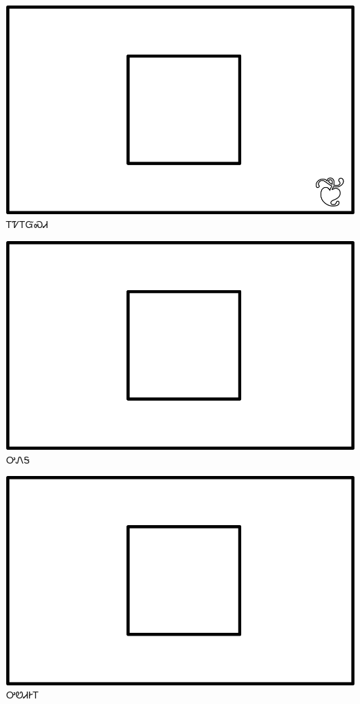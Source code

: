 \documentclass[avery5371]{flashcards}%
\begin{document}

\begin{flashcard}{
\includegraphics[width=0.95\columnwidth,height=.51\columnwidth,keepaspectratio]{../artwork/for-colors/square-white-with-leaf}
}\Huge ᎢᏤᎢᏳᏍᏗ
\end{flashcard}

\begin{flashcard}{
\includegraphics[width=0.95\columnwidth,height=.51\columnwidth,keepaspectratio]{../artwork/for-colors/square-white}
}\Huge ᎤᏁᎦ
\end{flashcard}

\begin{flashcard}{
\includegraphics[width=0.95\columnwidth,height=.51\columnwidth,keepaspectratio]{../artwork/for-colors/square-white}
}\Huge ᎤᏬᏗᎨᎢ
\end{flashcard}
\end{document}
